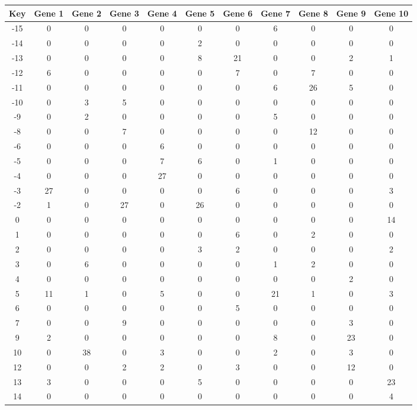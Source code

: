 \begin{tabular}{|c|c|c|c|c|c|c|c|c|c|c|}
\hline
Key & Gene 1 & Gene 2 & Gene 3 & Gene 4 & Gene 5 & Gene 6 & Gene 7 & Gene 8 & Gene 9 & Gene 10 \\
\hline
-15 & 0 & 0 & 0 & 0 & 0 & 0 & 6 & 0 & 0 & 0 \\
-14 & 0 & 0 & 0 & 0 & 2 & 0 & 0 & 0 & 0 & 0 \\
-13 & 0 & 0 & 0 & 0 & 8 & 21 & 0 & 0 & 2 & 1 \\
-12 & 6 & 0 & 0 & 0 & 0 & 7 & 0 & 7 & 0 & 0 \\
-11 & 0 & 0 & 0 & 0 & 0 & 0 & 6 & 26 & 5 & 0 \\
-10 & 0 & 3 & 5 & 0 & 0 & 0 & 0 & 0 & 0 & 0 \\
-9 & 0 & 2 & 0 & 0 & 0 & 0 & 5 & 0 & 0 & 0 \\
-8 & 0 & 0 & 7 & 0 & 0 & 0 & 0 & 12 & 0 & 0 \\
-6 & 0 & 0 & 0 & 6 & 0 & 0 & 0 & 0 & 0 & 0 \\
-5 & 0 & 0 & 0 & 7 & 6 & 0 & 1 & 0 & 0 & 0 \\
-4 & 0 & 0 & 0 & 27 & 0 & 0 & 0 & 0 & 0 & 0 \\
-3 & 27 & 0 & 0 & 0 & 0 & 6 & 0 & 0 & 0 & 3 \\
-2 & 1 & 0 & 27 & 0 & 26 & 0 & 0 & 0 & 0 & 0 \\
0 & 0 & 0 & 0 & 0 & 0 & 0 & 0 & 0 & 0 & 14 \\
1 & 0 & 0 & 0 & 0 & 0 & 6 & 0 & 2 & 0 & 0 \\
2 & 0 & 0 & 0 & 0 & 3 & 2 & 0 & 0 & 0 & 2 \\
3 & 0 & 6 & 0 & 0 & 0 & 0 & 1 & 2 & 0 & 0 \\
4 & 0 & 0 & 0 & 0 & 0 & 0 & 0 & 0 & 2 & 0 \\
5 & 11 & 1 & 0 & 5 & 0 & 0 & 21 & 1 & 0 & 3 \\
6 & 0 & 0 & 0 & 0 & 0 & 5 & 0 & 0 & 0 & 0 \\
7 & 0 & 0 & 9 & 0 & 0 & 0 & 0 & 0 & 3 & 0 \\
9 & 2 & 0 & 0 & 0 & 0 & 0 & 8 & 0 & 23 & 0 \\
10 & 0 & 38 & 0 & 3 & 0 & 0 & 2 & 0 & 3 & 0 \\
12 & 0 & 0 & 2 & 2 & 0 & 3 & 0 & 0 & 12 & 0 \\
13 & 3 & 0 & 0 & 0 & 5 & 0 & 0 & 0 & 0 & 23 \\
14 & 0 & 0 & 0 & 0 & 0 & 0 & 0 & 0 & 0 & 4 \\
\hline
\end{tabular}
